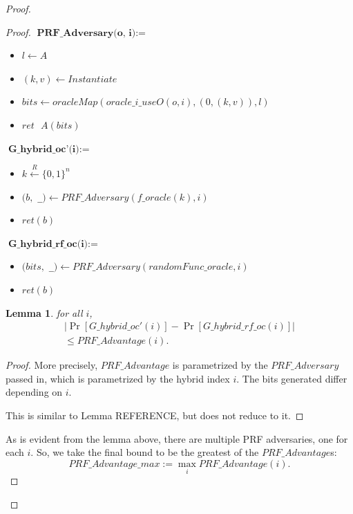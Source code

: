 \documentclass[12pt,lot, lof]{puthesis}
\newenvironment{game}
{ \begin{itemize}[noitemsep,nolistsep] 
}
{ \end{itemize}                  }
\newcommand{\s} {\textrm{ }}
\newcommand{\li} {\lstinline}
\newcommand{\samp}{\xleftarrow{R} \{0,1\}}
\newcommand{\lar}{\leftarrow}
\newtheorem{lem}{Lemma}[thm]
\begin{document}
\begin{proof}
\begin{proof}
$\textbf{PRF\_Adversary(o, i)} := $
\begin{game}
\item[] $l \leftarrow A$
\item[] $(k,v) \leftarrow Instantiate$
\item[] $bits \lar oracleMap(oracle\_i\_useO(o, i),(0, (k, v)),l)$
\item[] $ret \s A(bits)$ \\
\end{game}

$\textbf{G\_hybrid\_oc'(i)} := $
\begin{game}
\item[] $k \samp^n$
\item[] $(b, $ \li|_|$) \lar PRF\_Adversary (f\_oracle(k), i)$
\item[] $ ret(b)$ \\
\end{game}

$\textbf{G\_hybrid\_rf\_oc(i)} := $
\begin{game}
\item[] $(bits, $ \li|_|$) \lar PRF\_Adversary (randomFunc\_oracle, i)$
\item[] $ret(b)$ \\
\end{game}

\begin{lem} for all $i$,
\begin{gather*} 
| \Pr[G\_hybrid\_oc'(i) ] - \Pr[G\_hybrid\_rf\_oc(i)] | \\
\leq PRF\_Advantage(i).
\end{gather*}
\end{lem}
\begin{proof}
More precisely, $PRF\_Advantage$ is parametrized by the $PRF\_Adversary$ passed in, which is parametrized by the hybrid index $i$. The bits generated differ depending on $i$.

This is similar to Lemma REFERENCE, but does not reduce to it.
\end{proof}

As is evident from the lemma above, there are multiple PRF adversaries, one for each $i$. So, we take the final bound to be the greatest of the $PRF\_Advantage$s: 
$$PRF\_Advantage\_max := \max_i PRF\_Advantage(i).$$


\end{proof}
\end{proof}
\end{document}
